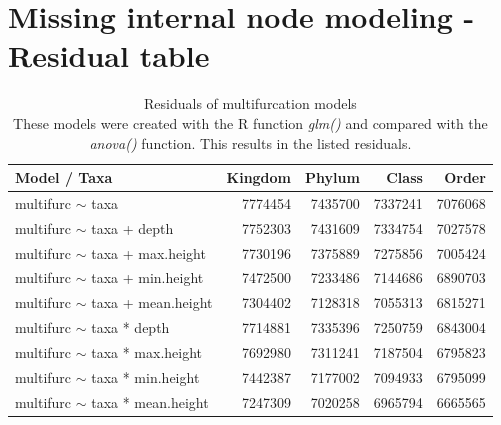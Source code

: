   \section{Missing internal node modeling - Residual table} %
    \begin{table}[h!]
      \begin{center}
          \begin{tabular}{ |l|r|r|r|r| }
            \hline
            \bfseries Model / Taxa & \bfseries Kingdom & \bfseries Phylum & \bfseries Class & \bfseries Order \\
            \hline \hline
            multifurc $\sim$ taxa & 7774454 & \cellcolor{green!10}7435700 & \cellcolor{green!15}7337241 & \cellcolor{green!30}7076068 \\
            \hline
            multifurc $\sim$ taxa + depth & 7752303 & \cellcolor{green!10}7431609 & \cellcolor{green!15}7334754 & \cellcolor{green!30}7027578 \\
            multifurc $\sim$ taxa + max.height & 7730196 & \cellcolor{green!15}7375889 & \cellcolor{green!20}7275856 & \cellcolor{green!30}7005424 \\
            multifurc $\sim$ taxa + min.height & \cellcolor{green!10}7472500 & \cellcolor{green!20}7233486 & \cellcolor{green!25}7144686 & \cellcolor{green!40}6890703 \\
            multifurc $\sim$ taxa + mean.height & \cellcolor{green!15}7304402 & \cellcolor{green!25}7128318 & \cellcolor{green!30}7055313 & \cellcolor{green!40}6815271 \\
            \hline
            multifurc $\sim$ taxa * depth & 7714881 & \cellcolor{green!15}7335396 & \cellcolor{green!20}7250759 & \cellcolor{green!40}6843004 \\
            multifurc $\sim$ taxa * max.height & \cellcolor{green!5}7692980 & \cellcolor{green!15}7311241 & \cellcolor{green!25}7187504 & \cellcolor{green!45}6795823 \\
            multifurc $\sim$ taxa * min.height & \cellcolor{green!10}7442387 & \cellcolor{green!25}7177002 & \cellcolor{green!30}7094933 & \cellcolor{green!45}6795099 \\
            multifurc $\sim$ taxa * mean.height & \cellcolor{green!20}7247309 & \cellcolor{green!30}7020258 & \cellcolor{green!35}6965794 & \cellcolor{green!50}6665565 \\
            \hline
          \end{tabular}
      \end{center}
      \caption{Residuals of multifurcation models \\
        These models were created with the R function \textit{glm()} and compared with the 
          \textit{anova()} function. This results in the listed residuals.}
      \label{table:Residuals multifurcation} 
    \end{table}

